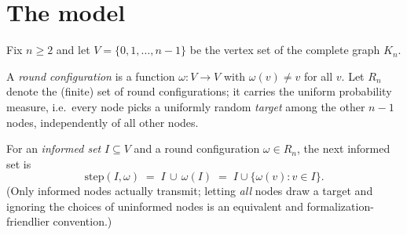 
\begin{abstract}
\noindent
We give a complete and elementary proof that the uniform \emph{push} protocol
on the complete graph $K_n$, started from a single informed node, informs all
$n$ nodes within $O(\log n)$ rounds with high probability. The probability
space is finite and uniform throughout; the only analytic ingredients are
Bernoulli's inequality and Markov's inequality, and the only concentration
tool is a one-line exponential-moment induction for adaptive Bernoulli
trials. No measure theory, no PMF/\texttt{ENNReal}, no Chernoff bounds, and
no martingales are used. This argument has been \emph{fully formalized} (no
\texttt{sorry}) in Lean~4 + Mathlib; the main theorem is
\texttt{RumorPush.push\_informs\_all\_whp}.
\end{abstract}

\section{The model}\label{sec:model}

Fix $n \ge 2$ and let $V = \{0,1,\dots,n-1\}$ be the vertex set of the
complete graph $K_n$.

\begin{definition}\label{def:round}
  \leanok
  A \emph{round configuration} is a function
  $\omega \colon V \to V$ with $\omega(v) \ne v$ for all $v$.
  Let $R_n$ denote the (finite) set of round configurations; it carries the
  uniform probability measure, i.e.\ every node picks a uniformly random
  \emph{target} among the other $n-1$ nodes, independently of all other
  nodes.
\end{definition}

\begin{definition}\label{def:step}
  \leanok
  For an \emph{informed set} $I \subseteq V$ and a round configuration
  $\omega \in R_n$, the next informed set is
  \[
    \mathrm{step}(I,\omega) \;=\; I \,\cup\, \omega(I)
    \;=\; I \cup \{\omega(v) : v \in I\}.
  \]
  (Only informed nodes actually transmit; letting \emph{all} nodes draw a
  target and ignoring the choices of uninformed nodes is an equivalent and
  formalization-friendlier convention.)
\end{definition}

